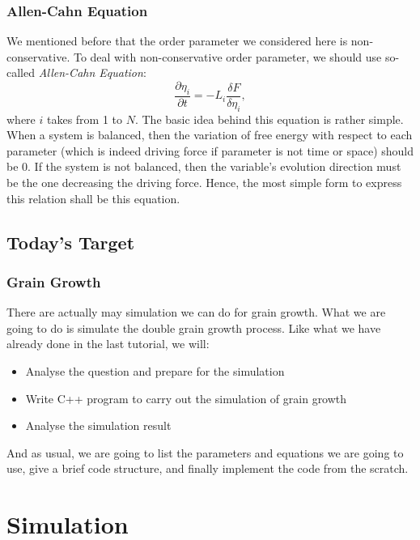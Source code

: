 \documentclass[compress,xcolor={dvipsnames}]{beamer}
\begin{document}
\begin{frame}
    \frametitle{Allen-Cahn Equation}

    We mentioned before that the order parameter we considered here is non-conservative. To deal with non-conservative order parameter, we should use so-called \emph{Allen-Cahn Equation}:
    \[
        \frac{\partial \eta_i}{\partial t} = -L_i \frac{\delta F }{\delta \eta_i },
    \]
    where \(i\) takes from 1 to \(N\). The basic idea behind this equation is rather simple. When a system is balanced, then the variation of free energy with respect to each parameter (which is indeed driving force if parameter is not time or space) should be 0. If the system is not balanced, then the variable's evolution direction must be the one decreasing the driving force. Hence, the most simple form to express this relation shall be this equation.

\end{frame}

\subsection{Today's Target}
\begin{frame}
    \frametitle{Grain Growth}

    There are actually may simulation we can do for grain growth. What we are going to do is simulate the double grain growth process. Like what we have already done in the last tutorial, we will:
    \begin{itemize}
        \item Analyse the question and prepare for the simulation
        \item Write C++ program to carry out the simulation of grain growth
        \item Analyse the simulation result
    \end{itemize}

    And as usual, we are going to list the parameters and equations we are going to use, give a brief code structure, and finally implement the code from the scratch.
\end{frame}

\section{Simulation}
\end{document}
